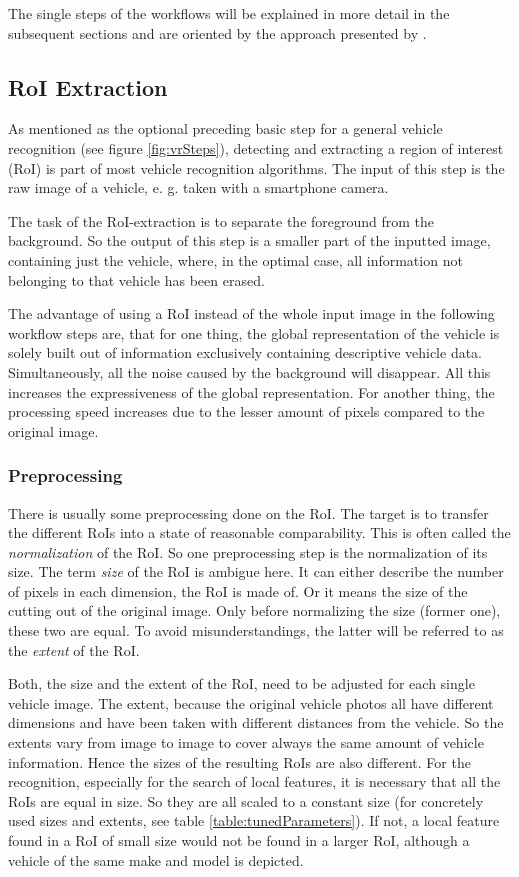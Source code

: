The single steps of the workflows will be explained in more detail in the subsequent sections and are oriented by the approach presented by \citep{siddiqui2015robust}.

\subsection{RoI Extraction}\label{sec:roiExtraction}
As mentioned as the optional preceding basic step for a general vehicle recognition (see figure \ref{fig:vrSteps}), detecting and extracting a region of interest (RoI) is part of most vehicle recognition algorithms. The input of this step is the raw image of a vehicle, e. g. taken with a smartphone camera.

The task of the RoI-extraction is to separate the foreground from the background. So the output of this step is a smaller part of the inputted image, containing just the vehicle, where, in the optimal case, all information not belonging to that vehicle has been erased.

The advantage of using a RoI instead of the whole input image in the following workflow steps are, that for one thing, the global representation of the vehicle is solely built out of information exclusively containing descriptive vehicle data. Simultaneously, all the noise caused by the background will disappear. All this increases the expressiveness of the global representation. For another thing, the processing speed increases due to the lesser amount of pixels compared to the original image.

\subsubsection{Preprocessing}
There is usually some preprocessing done on the RoI. The target is to transfer the different RoIs into a state of reasonable comparability. This is often called the \emph{normalization} of the RoI. So one preprocessing step is the normalization of its size. The term \emph{size} of the RoI is ambigue here. It can either describe the number of pixels in each dimension, the RoI is made of. Or it means the size of the cutting out of the original image. Only before normalizing the size (former one), these two are equal. To avoid misunderstandings, the latter will be referred to as the \emph{extent} of the RoI.

Both, the size and the extent of the RoI, need to be adjusted for each single vehicle image. The extent, because the original vehicle photos all have different dimensions and have been taken with different distances from the vehicle. So the extents vary from image to image to cover always the same amount of vehicle information. Hence the sizes of the resulting RoIs are also different. For the recognition, especially for the search of local features, it is necessary that all the RoIs are equal in size. So they are all scaled to a constant size (for concretely used sizes and extents, see table \ref{table:tunedParameters}). If not, a local feature found in a RoI of small size would not be found in a larger RoI, although a vehicle of the same make and model is depicted.

